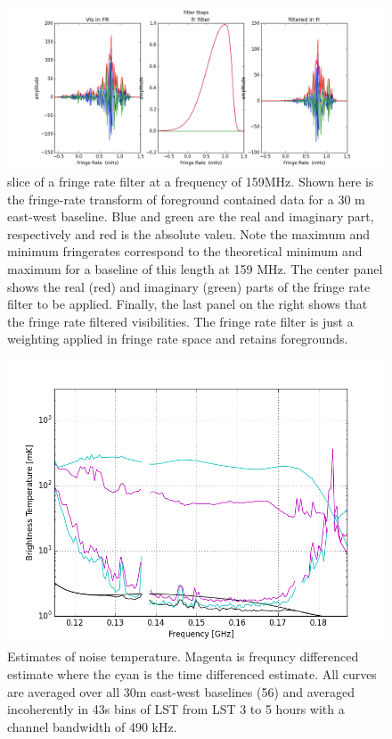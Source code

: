 \documentclass[twocolumn,numberedappendix]{emulateapj}
\begin{document}
\begin{figure}[t!]\centering
\includegraphics[width=2\columnwidth]{plots/fr_preserved_signal.png}
\caption{slice of a fringe rate filter at a frequency of 159MHz. Shown here is
the fringe-rate transform of foreground contained data for a 30 m east-west
baseline. Blue and green are the real and imaginary part, respectively and red
is the absolute valeu. Note the maximum and minimum fringerates correspond to
the theoretical minimum and maximum for a baseline of this length at 159 MHz.
The center panel shows the real (red)  and imaginary (green) parts of the fringe
rate filter to be applied. Finally, the last panel on the right shows that the
fringe rate filtered visibilities. The fringe rate filter is just a weighting
applied in fringe rate space and retains foregrounds.}
\label{fig:fr_preserved_signal}
\end{figure}

\begin{figure}[h!]\centering
\includegraphics[width=\columnwidth, height=.8\columnwidth]{plots/noise_t_35.png}
\caption{Estimates of noise temperature. Magenta is frequncy differenced
estimate where the cyan is the time differenced estimate. All curves are
averaged over all 30m east-west baselines (56) and averaged incoherently in 43s
bins of LST from LST 3 to 5 hours with a channel bandwidth of 490 kHz.}
\label{fig:noise_t}
\end{figure}
\end{document}
